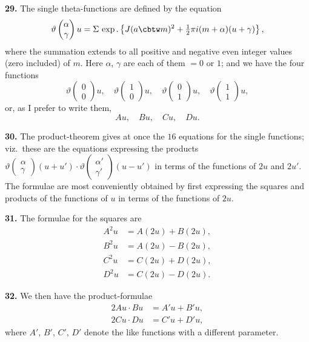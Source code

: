 \documentclass[11pt,a4paper]{book}
\begin{document}
\noindent\textbf{29.}\quad
The single theta-functions are defined by the equation
\[
\vartheta\begin{pmatrix} \alpha \\ \gamma \end{pmatrix}u = \Sigma\, \exp.\left\{J(a\cbtw m)^2 + \tfrac{1}{2}\pi i(m + \alpha)(u + \gamma)\right\},
\]
where the summation extends to all positive and negative even integer values (zero included) of $m$. Here $\alpha$, $\gamma$ are each of them $= 0$ or $1$; and we have the four functions
\[
\vartheta\begin{pmatrix} 0 \\ 0 \end{pmatrix}u,\quad
\vartheta\begin{pmatrix} 1 \\ 0 \end{pmatrix}u,\quad
\vartheta\begin{pmatrix} 0 \\ 1 \end{pmatrix}u,\quad
\vartheta\begin{pmatrix} 1 \\ 1 \end{pmatrix}u,
\]
or, as I prefer to write them,
\[
Au,\quad Bu,\quad Cu,\quad Du.
\]

\noindent\textbf{30.}\quad
The product-theorem gives at once the $16$ equations for the single functions; viz.\ these are the equations expressing the products $\vartheta\begin{pmatrix} \alpha \\ \gamma \end{pmatrix}(u + u') \cdot \vartheta\begin{pmatrix} \alpha' \\ \gamma' \end{pmatrix}(u - u')$ in terms of the functions of $2u$ and $2u'$. The formulae are most conveniently obtained by first expressing the squares and products of the functions of $u$ in terms of the functions of $2u$.

\noindent\textbf{31.}\quad
The formulae for the squares are
\begin{align*}
A^2 u &= A(2u) + B(2u), \\
B^2 u &= A(2u) - B(2u), \\
C^2 u &= C(2u) + D(2u), \\
D^2 u &= C(2u) - D(2u).
\end{align*}

\noindent\textbf{32.}\quad
We then have the product-formulae
\begin{align*}
2Au \cdot Bu &= A'u + B'u, \\
2Cu \cdot Du &= C'u + D'u,
\end{align*}
where $A'$, $B'$, $C'$, $D'$ denote the like functions with a different parameter.
\end{document}
